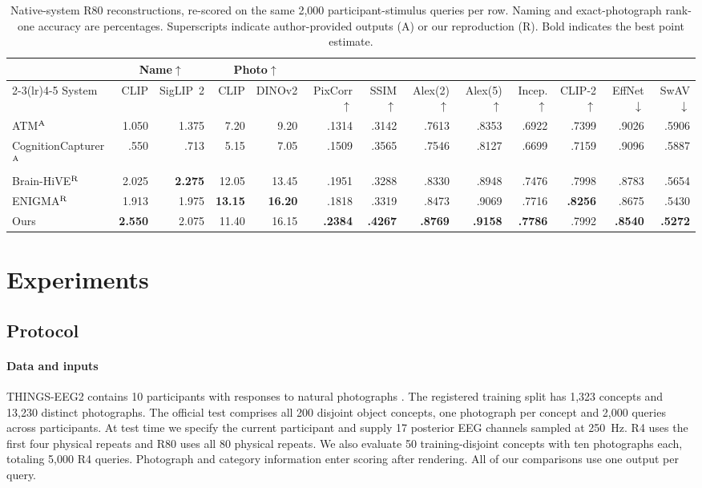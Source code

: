 \documentclass[letterpaper,10pt,conference]{IEEEtran}
\begin{document}
\begin{table}[t]
\centering
\caption{Native-system R80 reconstructions, re-scored on the same 2,000 participant-stimulus queries per row. Naming and exact-photograph rank-one accuracy are percentages. Superscripts indicate author-provided outputs (A) or our reproduction (R). Bold indicates the best point estimate.}
\label{tab:native}
\small
\setlength{\tabcolsep}{3.2pt}
\begin{tabular}{lrrrrrrrrrrrr}
\toprule
 & \multicolumn{2}{c}{Name$\uparrow$} & \multicolumn{2}{c}{Photo$\uparrow$} & & & & & & & & \\
\cmidrule(lr){2-3}\cmidrule(lr){4-5}
System & CLIP & SigLIP~2 & CLIP & DINOv2 & PixCorr$\uparrow$ & SSIM$\uparrow$ & Alex(2)$\uparrow$ & Alex(5)$\uparrow$ & Incep.$\uparrow$ & CLIP-2$\uparrow$ & EffNet$\downarrow$ & SwAV$\downarrow$ \\
\midrule
ATM$^{\rm A}$ & 1.050 & 1.375 & 7.20 & 9.20 & .1314 & .3142 & .7613 & .8353 & .6922 & .7399 & .9026 & .5906 \\
CognitionCapturer$^{\rm A}$ & .550 & .713 & 5.15 & 7.05 & .1509 & .3565 & .7546 & .8127 & .6699 & .7159 & .9096 & .5887 \\
Brain-HiVE$^{\rm R}$ & 2.025 & \textbf{2.275} & 12.05 & 13.45 & .1951 & .3288 & .8330 & .8948 & .7476 & .7998 & .8783 & .5654 \\
ENIGMA$^{\rm R}$ & 1.913 & 1.975 & \textbf{13.15} & \textbf{16.20} & .1818 & .3319 & .8473 & .9069 & .7716 & \textbf{.8256} & .8675 & .5430 \\
Ours & \textbf{2.550} & 2.075 & 11.40 & 16.15 & \textbf{.2384} & \textbf{.4267} & \textbf{.8769} & \textbf{.9158} & \textbf{.7786} & .7992 & \textbf{.8540} & \textbf{.5272} \\
\bottomrule
\end{tabular}
\end{table}

\section{Experiments}
\label{sec:results}

\subsection{Protocol}

\paragraph{Data and inputs}
THINGS-EEG2 contains 10 participants with responses to natural photographs \cite{gifford2022}. The registered training split has 1,323 concepts and 13,230 distinct photographs. The official test comprises all 200 disjoint object concepts, one photograph per concept and 2,000 queries across participants. At test time we specify the current participant and supply 17 posterior EEG channels sampled at 250~Hz. R4 uses the first four physical repeats and R80 uses all 80 physical repeats. We also evaluate 50 training-disjoint concepts with ten photographs each, totaling 5,000 R4 queries. Photograph and category information enter scoring after rendering. All of our comparisons use one output per query.
\end{document}
